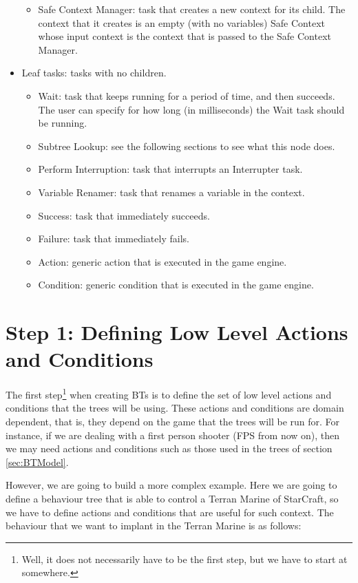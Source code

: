 \documentclass[a4paper]{article}
\newcommand{\starcraft}{StarCraft\xspace}
\begin{document}
\begin{itemize}
\begin{itemize}
    \item Safe Context Manager: task that creates a new context for its child. The context that it creates is an empty (with no variables) Safe Context whose input context is the context that is passed to the Safe Context Manager.
  \end{itemize}
  \item Leaf tasks: tasks with no children.
  \begin{itemize}
    \item Wait: task that keeps running for a period of time, and then succeeds. The user can specify for how long (in milliseconds) the Wait task should be running.
    \item Subtree Lookup: see the following sections to see what this node does.
    \item Perform Interruption: task that interrupts an Interrupter task.
    \item Variable Renamer: task that renames a variable in the context.
    \item Success: task that immediately succeeds.
    \item Failure: task that immediately fails.
    \item Action: generic action that is executed in the game engine.
    \item Condition: generic condition that is executed in the game engine.
  \end{itemize}
\end{itemize}

\section{Step 1: Defining Low Level Actions and Conditions}\label{sec:DefiningLowLevelActionsAndConditions}

The first step\footnote{Well, it does not necessarily have to be the first step, but we have to start at somewhere.} when creating BTs is to define the set of low level actions and conditions that the trees will be using. These actions and conditions are domain dependent, that is, they depend on the game that the trees will be run for. For instance, if we are dealing with a first person shooter (FPS from now on), then we may need actions and conditions such as those used in the trees of section \ref{sec:BTModel}. 

However, we are going to build a more complex example. Here we are going to define a behaviour tree that is able to control a Terran Marine of \starcraft, so we have to define actions and conditions that are useful for such context. The behaviour that we want to implant in the Terran Marine is as follows:
\end{document}
